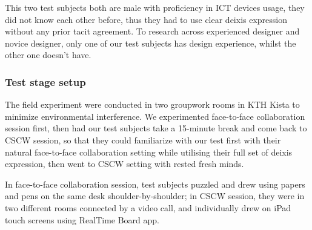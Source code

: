 \documentclass[12pt,twoside]{article}
\begin{document}
This two test subjects both are male with proficiency in ICT devices usage, they did not know each other before, thus they had to use clear deixis expression without any prior tacit agreement. To research across experienced designer and novice designer, only one of our test subjects has design experience, whilst the other one doesn't have. 

\subsubsection{Test stage setup}

The field experiment were conducted in two groupwork rooms in KTH Kista to minimize environmental interference. We experimented face-to-face collaboration session first, then had our test subjects take a 15-minute break and come back to CSCW session, so that they could familiarize with our test first with their natural face-to-face collaboration setting while utilising their full set of deixis expression, then went to CSCW setting with rested fresh minds.

In face-to-face collaboration session, test subjects puzzled and drew using papers and pens on the same desk shoulder-by-shoulder; in CSCW session, they were in two different rooms connected by a video call, and individually drew on iPad touch screens using RealTime Board app.
\end{document}
